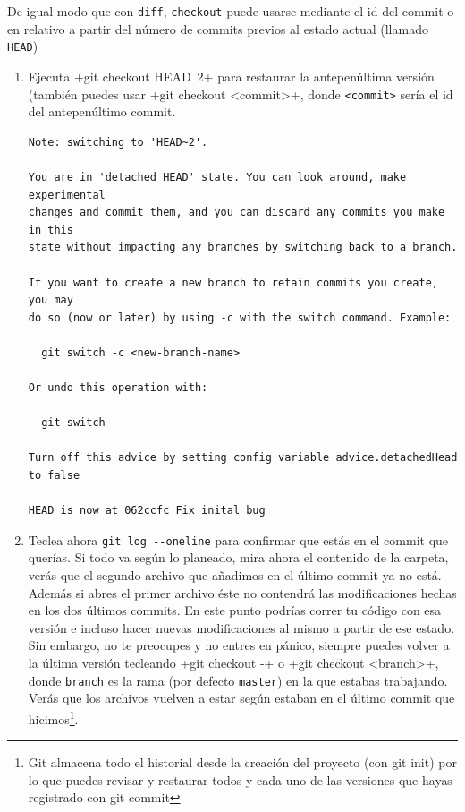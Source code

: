 \documentclass[a4paper,10pt]{article}
\begin{document}
    De igual modo que con \verb+diff+, \verb+checkout+ puede usarse mediante el id del commit o en relativo a partir del número de commits previos al estado actual (llamado \verb+HEAD+)\
    \begin{enumerate}
      \item Ejecuta \cverb+git checkout HEAD~2+ para restaurar la antepenúltima versión (también puedes usar \cverb+git checkout <commit>+, donde \verb+<commit>+ sería el id del antepenúltimo commit.
      
      \begin{lstlisting}[style=custom]
Note: switching to 'HEAD~2'.

You are in 'detached HEAD' state. You can look around, make experimental
changes and commit them, and you can discard any commits you make in this
state without impacting any branches by switching back to a branch.

If you want to create a new branch to retain commits you create, you may
do so (now or later) by using -c with the switch command. Example:

  git switch -c <new-branch-name>

Or undo this operation with:

  git switch -

Turn off this advice by setting config variable advice.detachedHead to false

HEAD is now at 062ccfc Fix inital bug
    \end{lstlisting}
      
    \item Teclea ahora \verb+git log --oneline+ para confirmar que estás en el commit que querías. Si todo va según lo planeado, mira ahora el contenido de la carpeta, verás que el segundo archivo que añadimos en el último commit ya no está. Además si abres el primer archivo éste no contendrá las modificaciones hechas en los dos últimos commits. En este punto podrías correr tu código con esa versión e incluso hacer nuevas modificaciones al mismo a partir de ese estado. Sin embargo, no te preocupes y no entres en pánico, siempre puedes volver a la última versión tecleando \cverb+git checkout -+ o \cverb+git checkout <branch>+, donde \verb+branch+ es la rama (por defecto \verb+master+) en la que estabas trabajando. Verás que los archivos vuelven a estar según estaban en el último commit que hicimos\footnote{Git almacena todo el historial desde la creación del proyecto (con git init) por lo que puedes revisar y restaurar todos y cada uno de las versiones que hayas registrado con git commit}.


\end{enumerate}
\end{document}
